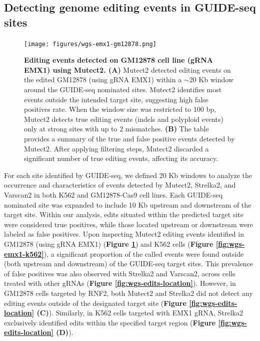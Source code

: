 \documentclass[a4paper, titlepage, openright]{book}
\begin{document}
\subsection{Detecting genome editing events in GUIDE-seq sites}
\begin{figure}[!]
    \centering
    \texttt{[image: figures/wgs-emx1-gm12878.png]}
    \caption[Editing events detected on GM12878 cell line (gRNA EMX1) using Mutect2]{\textbf{Editing events detected on GM12878 cell line (gRNA EMX1) using Mutect2. (A)}  Mutect2 detected editing events on the edited GM12878 (using gRNA EMX1) within a $\sim$20 Kb window around the GUIDE-seq nominated sites. Mutect2 identifies most events outside the intended target site, suggesting high false positives rate. When the window size was restricted to 100 bp, Mutect2 detects true editing events (indels and polyploid events) only at strong sites with up to 2 mismatches. \textbf{(B)} The table provides a summary of the true and false positive events detected by Mutect2. After applying filtering steps, Mutect2 discarded a significant number of true editing events, affecting its accuracy.}
    \label{fig:wgs-emx1-gm12878}
\end{figure}
%
For each site identified by GUIDE-seq, we defined 20 Kb windows to analyze the occurrence and characteristics of events detected by Mutect2, Strelka2, and Varscan2 in both K562 and GM12878-Cas9 cell lines. Each GUIDE-seq nominated site was expanded to include 10 Kb upstream and downstream of the target site. Within our analysis, edits situated within the predicted target site were considered true positives, while those located upstream or downstream were labeled as false positives. Upon inspecting Mutect2 editing events identified in GM12878 (using gRNA EMX1) (\textbf{Figure \ref{fig:wgs-emx1-gm12878}}) and K562 cells (\textbf{Figure \ref{fig:wgs-emx1-k562}}), a significant proportion of the called events were found outside (both upstream and downstream) of the GUIDE-seq target sites. This prevalence of false positives was also observed with Strelka2 and Varscan2, across cells treated with other gRNAs (\textbf{Figure \ref{fig:wgs-edits-location}}). However, in GM12878 cells targeted by RNF2, both Mutect2 and Strelka2 did not detect any editing events outside of the designated target site (\textbf{Figure \ref{fig:wgs-edits-location} (C)}). Similarly, in K562 cells targeted with EMX1 gRNA, Strelka2 exclusively identified edits within the specified target region (\textbf{Figure \ref{fig:wgs-edits-location} (D)}).
\end{document}
